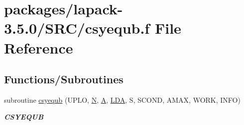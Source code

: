 \hypertarget{csyequb_8f}{}\section{packages/lapack-\/3.5.0/\+S\+R\+C/csyequb.f File Reference}
\label{csyequb_8f}
\subsection*{Functions/\+Subroutines}
\begin{DoxyCompactItemize}
\item 
subroutine \hyperlink{group__complexSYcomputational_ga076074a11ac1385855e8efe9cc3ca048}{csyequb} (U\+P\+L\+O, \hyperlink{polmisc_8c_a0240ac851181b84ac374872dc5434ee4}{N}, \hyperlink{classA}{A}, \hyperlink{example__user_8c_ae946da542ce0db94dced19b2ecefd1aa}{L\+D\+A}, S, S\+C\+O\+N\+D, A\+M\+A\+X, W\+O\+R\+K, I\+N\+F\+O)
\begin{DoxyCompactList}\small\item\em {\bfseries C\+S\+Y\+E\+Q\+U\+B} \end{DoxyCompactList}\end{DoxyCompactItemize}
